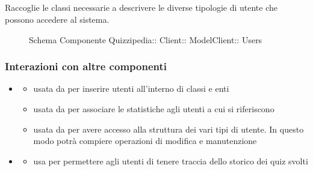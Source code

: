 \subsection{}
Raccoglie le classi necessarie a descrivere le diverse tipologie di utente che possono accedere al sistema.
\begin{figure}[H]
\centering
\noindent{}
\caption[Schema Componente Users]{Schema Componente Quizzipedia:: Client:: ModelClient:: Users}
\end{figure}
\subsubsection{Interazioni con altre componenti}
\begin{itemize}
\item {}
\begin{itemize}
\item usata da  per inserire utenti all'interno di classi e enti
\item usata da  per associare le statistiche agli utenti a cui si riferiscono
\item usata da  per avere accesso alla struttura dei vari tipi di utente. In questo modo potrà compiere operazioni di modifica e manutenzione
\end{itemize}
\item {}
\begin{itemize}
\item usa  per permettere agli utenti di tenere traccia dello storico dei quiz svolti
\end{itemize}
\end{itemize}
